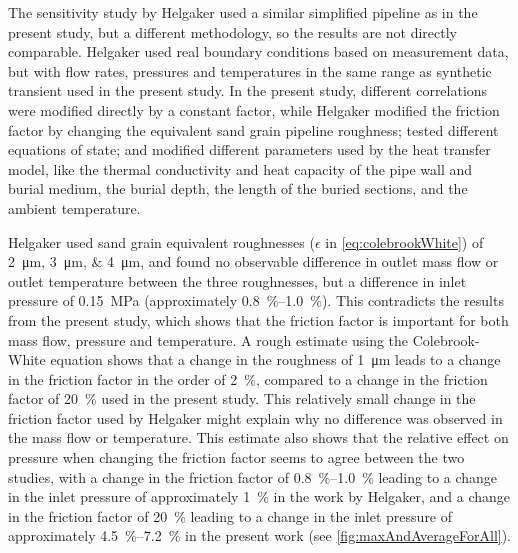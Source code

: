 

The sensitivity study by Helgaker \cite{Helgaker2013Modeling} used a similar simplified pipeline as in the present study, but a different methodology, so the results are not directly comparable. Helgaker used real boundary conditions based on measurement data, but with flow rates, pressures and temperatures in the same range as synthetic transient used in the present study. %
%
In the present study, different correlations were modified directly by a constant factor, while Helgaker %
%
modified the friction factor by changing the equivalent sand grain pipeline roughness; tested different equations of state; and modified different parameters used by the heat transfer model, like the thermal conductivity and heat capacity of the pipe wall and burial medium, the burial depth, the length of the buried sections, and the ambient temperature. 

Helgaker used sand grain equivalent roughnesses ($\epsilon$ in \cref{eq:colebrookWhite}) of \SIlist{2;3;4}{\micro\meter}, and found no observable difference in outlet mass flow or outlet temperature between the three roughnesses, but a difference in inlet pressure of \SI{0.15}{\mega\pascal} (approximately \SIrange{0.8}{1.0}{\percent}). %
This contradicts the results from the present study, which shows that the friction factor is important for both mass flow, pressure and temperature. %
A rough estimate using the Colebrook-White equation shows that a change in the roughness of \SI{1}{\micro\meter} leads to a change in the friction factor in the order of \SI{2}{\percent}, compared to a change in the friction factor of \SI{20}{\percent} used in the present study. This relatively small change in the friction factor used by Helgaker might explain why no difference was observed in the mass flow or temperature. This estimate also shows that the relative effect on pressure when changing the friction factor seems to agree between the two studies, with a change in the friction factor of \SIrange{0.8}{1.0}{\percent} leading to a change in the inlet pressure of approximately \SI{1}{\percent} in the work by Helgaker, and a change in the friction factor of \SI{20}{\percent} leading to a change in the inlet pressure of approximately \SIrange{4.5}{7.2}{\percent} in the present work (see \cref{fig:maxAndAverageForAll}).

